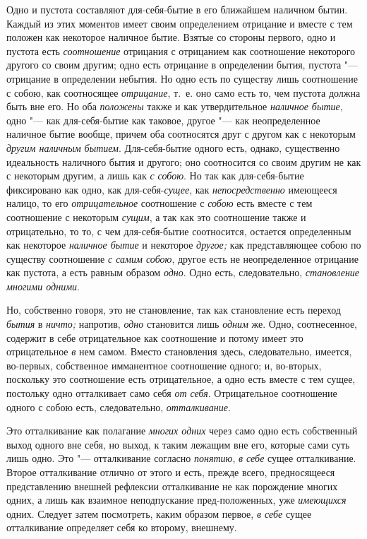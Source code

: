 Одно и пустота составляют для-себя-бытие в его ближайшем наличном бытии.
Каждый из этих моментов имеет своим определением отрицание и вместе с тем
положен как некоторое наличное бытие. Взятые со стороны первого, одно и
пустота есть {\em соотношение} отрицания с отрицанием
как соотношение некоторого другого со своим другим; одно есть отрицание в
определении бытия, пустота "--- отрицание в определении небытия. Но одно есть
по существу лишь соотношение с собою, как соотносящее
{\em отрицание}, т.~е. оно само есть то, чем пустота
должна быть вне его. Но оба {\em положены} также и как
утвердительное {\em наличное бытие}, одно "--- как
для-себя-бытие как таковое, другое "--- как неопределенное наличное бытие
вообще, причем оба соотносятся друг с другом как с некоторым
{\em другим наличным бытием}. Для-себя-бытие одного
есть, однако, существенно идеальность наличного бытия и другого; оно
соотносится со своим другим не как с некоторым другим, а лишь как
{\em с собою}. Но так как для-себя-бытие фиксировано
как одно, как для-себя-{\em сущее}, как
{\em непосредственно} имеющееся налицо, то его
{\em отрицательное} соотношение с
{\em собою} есть вместе с тем соотношение с некоторым
{\em сущим}, а так как это соотношение также и
отрицательно, то то, с чем для-себя-бытие соотносится, остается
определенным как некоторое {\em наличное бытие} и
некоторое {\em другое;} как представляющее собою по
существу соотношение {\em с самим собою}, другое есть
не неопределенное отрицание как пустота, а есть равным образом
{\em одно}. Одно есть, следовательно, {\em становление многими одними}.

Но, собственно говоря, это не становление, так как становление есть переход
{\em бытия} в {\em ничто;} напротив, {\em одно} становится лишь
{\em одним} же. Одно, соотнесенное, содержит в себе
отрицательное как соотношение и потому имеет это отрицательное
{\em в} нем самом. Вместо становления здесь,
следовательно, имеется, во-первых, собственное имманентное соотношение
одного; и, во-вторых, поскольку это соотношение есть отрицательное, а одно
есть вместе с тем сущее, постольку одно отталкивает само себя
{\em от себя}. Отрицательное соотношение одного с собою
есть, следовательно, {\em отталкивание}.

Это отталкивание как полагание {\em многих одних} через
само одно есть собственный выход одного вне себя, но выход, к таким лежащим
вне его, которые сами суть лишь одно. Это "--- отталкивание согласно
{\em понятию}, {\em в себе} сущее
отталкивание. Второе отталкивание отлично от этого и есть, прежде всего,
предносящееся представлению внешней рефлексии отталкивание не как
порождение многих одних, а лишь как взаимное неподпускание пред-положенных,
уже {\em имеющихся} одних. Следует затем посмотреть,
каким образом первое, {\em в себе} сущее отталкивание
определяет себя ко второму, внешнему.

